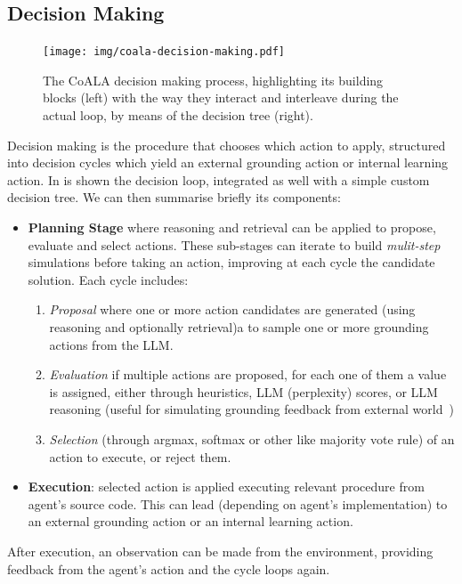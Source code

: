 \subsection{Decision Making}
\begin{figure}[ht]
    \centering
    \texttt{[image: img/coala-decision-making.pdf]}
    \caption{The \ac{CoALA} decision making process, highlighting its building
        blocks (left) with the way they interact and interleave during the actual
        loop, by means of the decision tree (right).}
    \label{fig:coala-decision-making}
\end{figure}
Decision making is the procedure that chooses which action to apply, structured
into decision cycles which yield an external grounding action or internal
learning action.
In  is shown the decision loop, integrated as well
with a simple custom decision tree. We can then summarise briefly its components:
\begin{itemize}
    \item \textbf{Planning Stage} where reasoning and retrieval can be applied
        to propose, evaluate and select actions. These sub-stages can iterate
        to build \emph{mulit-step} simulations before taking an action,
        improving at each cycle the candidate solution. Each cycle includes:
        \begin{enumerate}
            \item \emph{Proposal} where one or more action candidates are
                generated (using reasoning and optionally retrieval)a to sample
                one or more grounding actions from the \ac{LLM}.
            \item \emph{Evaluation} if multiple actions are proposed, for each
                one of them a value is assigned, either through heuristics,
                \ac{LLM} (perplexity) scores, or \ac{LLM} reasoning (useful for
                simulating grounding feedback from external
                world~\cite{hao2023reasoninglanguagemodelplanning})
            \item \emph{Selection} (through argmax, softmax or other like
                majority vote rule) of an action to execute, or reject them.
        \end{enumerate}
    \item \textbf{Execution}: selected action is applied executing relevant
        procedure from agent's source code. This can lead (depending on agent's
        implementation) to an external grounding action or an internal learning
        action.
\end{itemize}
%
After execution, an observation can be made from the environment, providing
feedback from the agent's action and the cycle loops again.
